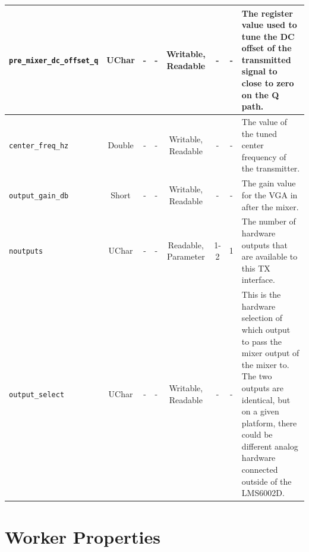 \documentclass{article}
\begin{document}
\begin{landscape}
\begin{scriptsize}
\begin{tabular}{|p{3cm}|c|c|c|c|c|c|p{10cm}|}
			\hline
			\verb+pre_mixer_dc_offset_q+ & UChar  & -        & -          & Writable, Readable  & -     & -       & The register value used to tune the DC offset of the transmitted signal to close to zero on the Q path.                                                                                                                     \\
			\hline
			\verb+center_freq_hz+        & Double & -        & -          & Writable, Readable  & -     & -       & The value of the tuned center frequency of the transmitter.                                                                                                                                                                 \\
			\hline
			\verb+output_gain_db+        & Short  & -        & -          & Writable, Readable  & -     & -       & The gain value for the VGA in after the mixer.                                                                                                                                                                              \\
			\hline
			\verb+noutputs+              & UChar  & -        & -          & Readable, Parameter & 1-2   & 1       & The number of hardware outputs that are available to this TX interface.                                                                                                                                                     \\
			\hline
			\verb+output_select+         & UChar  & -        & -          & Writable, Readable  & -     & -       & This is the hardware selection of which output to pass the mixer output of the mixer to. The two outputs are identical, but on a given platform, there could be different analog hardware connected outside of the LMS6002D. \\
			\hline
		\end{tabular}
	\end{scriptsize}

	\section*{Worker Properties}

\end{landscape}
\end{document}

